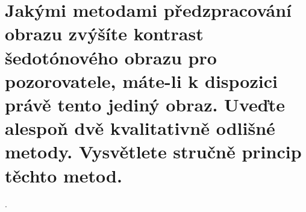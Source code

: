 \section{Jakými metodami předzpracování obrazu zvýšíte kontrast šedotónového obrazu pro pozorovatele, máte-li k 
dispozici právě tento jediný obraz. Uveďte alespoň dvě kvalitativně odlišné metody. Vysvětlete stručně princip těchto 
metod.}.